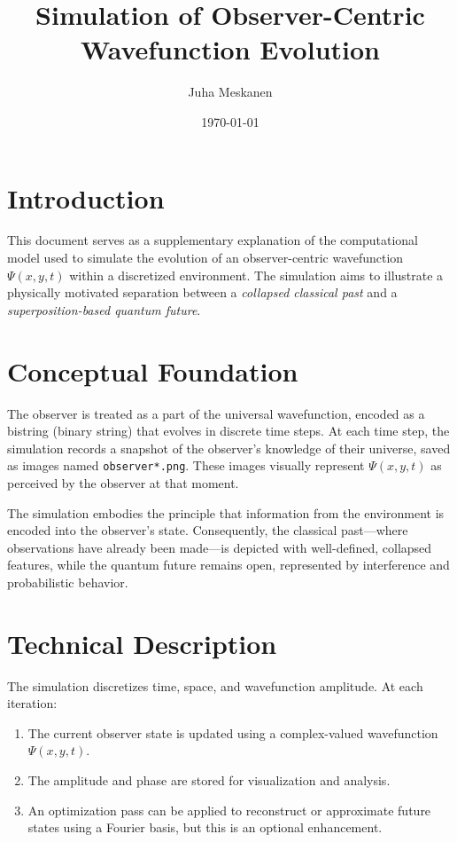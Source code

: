 \documentclass{article}
\title{Simulation of Observer-Centric Wavefunction Evolution}
\author{Juha Meskanen}
\date{\today}
\begin{document}
\maketitle

\section{Introduction}
This document serves as a supplementary explanation of the computational model used to simulate the evolution of an observer-centric wavefunction $\Psi(x, y, t)$ within a discretized environment. The simulation aims to illustrate a physically motivated separation between a \emph{collapsed classical past} and a \emph{superposition-based quantum future}.

\section{Conceptual Foundation}

The observer is treated as a part of the universal wavefunction, encoded as a bistring (binary string) that evolves in discrete time steps. At each time step, the simulation records a snapshot of the observer's knowledge of their universe, saved as images named \texttt{observer*.png}. These images visually represent $\Psi(x, y, t)$ as perceived by the observer at that moment.

The simulation embodies the principle that information from the environment is encoded into the observer's state. Consequently, the classical past---where observations have already been made---is depicted with well-defined, collapsed features, while the quantum future remains open, represented by interference and probabilistic behavior.

\section{Technical Description}

The simulation discretizes time, space, and wavefunction amplitude. At each iteration:
\begin{enumerate}
    \item The current observer state is updated using a complex-valued wavefunction $\Psi(x, y, t)$.
    \item The amplitude and phase are stored for visualization and analysis.
    \item An optimization pass can be applied to reconstruct or approximate future states using a Fourier basis, but this is an optional enhancement.
\end{enumerate}
\end{document}
